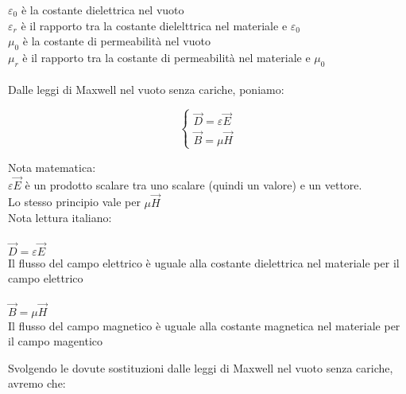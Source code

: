 $\varepsilon_0$ è la costante dielettrica nel vuoto \\ 
$\varepsilon_r$ è il rapporto tra la costante dielelttrica nel materiale e $\varepsilon_0$ \\ 

$\mu_0$ è la costante di permeabilità nel vuoto \\ 
$\mu_r$ è il rapporto tra la costante di permeabilità nel materiale e $\mu_0$ \\ \\ 

Dalle leggi di Maxwell nel vuoto senza cariche, poniamo: 

{ \Large \begin{equation}
    \begin{cases}
        
        \vec{D} = \varepsilon \vec{E} \\ 
        \vec{B} = \mu \vec{H}

    \end{cases}
\end{equation}} 

\begin{tcolorbox}

    Nota matematica: \\  
    $\varepsilon \vec{E}$ è un prodotto scalare tra uno scalare (quindi un valore) e un vettore. \\ 
    Lo stesso principio vale per $\mu \vec{H}$ \\  

    Nota lettura italiano: \\ \\  
    $\vec{D} = \varepsilon \vec{E}$ \\ 
    Il flusso del campo elettrico è uguale alla costante dielettrica nel materiale per il campo elettrico \\ \\ 

    $\vec{B} = \mu \vec{H}$ \\ 
    Il flusso del campo magnetico è uguale alla costante magnetica nel materiale per il campo magentico 



\end{tcolorbox}


Svolgendo le dovute sostituzioni dalle leggi di Maxwell nel vuoto senza cariche, avremo che: \\ \\ 


